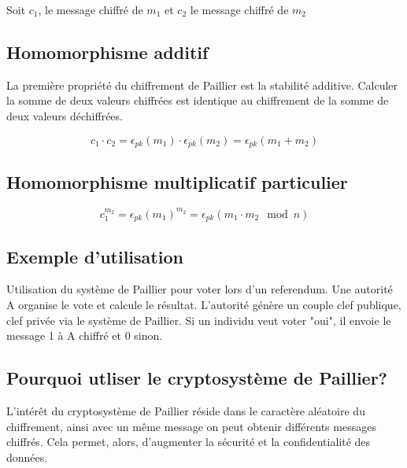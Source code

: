 \noindent Soit $c_1$, le message chiffré de $m_1$ et $c_2$ le message chiffré de $m_2$

\subsection{Homomorphisme additif}
La première propriété du chiffrement de Paillier est la stabilité additive. Calculer la somme de deux valeurs chiffrées est identique au chiffrement de la somme de deux valeurs déchiffrées.\par
\[
c_{1}\cdot c_{2} = \epsilon_{pk}(m_{1}) \cdot \epsilon_{pk}(m_{2})= \epsilon_{pk}(m_{1}+ m_{2})
\]

\subsection{Homomorphisme multiplicatif particulier}
\[
c_{1}^{m_2} = \epsilon_{pk}(m_{1})^{m_2}=\epsilon_{pk}(m_{1} \cdot m_2\mod n)
\]

\subsection{Exemple d'utilisation}
Utilisation du système de Paillier pour voter lors d'un referendum. Une autorité A organise le vote et calcule le résultat. L'autorité génère un couple clef publique, clef privée via le système de Paillier.
Si un individu veut voter "oui", il envoie le message 1 à A chiffré et 0 sinon.
\vspace{1\baselineskip}

\subsection{Pourquoi utliser le cryptosystème de Paillier?}
L'intérêt du cryptosystème de Paillier réside dans le caractère aléatoire du chiffrement, ainsi avec un même message on peut obtenir différents messages chiffrés. Cela permet, alors, d'augmenter la sécurité et la confidentialité des données.
 
